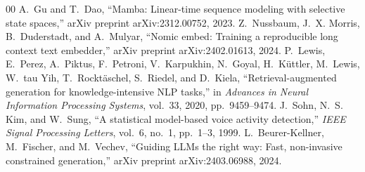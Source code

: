 \documentclass[conference]{IEEEtran}
\begin{document}
\begin{thebibliography}{00}
 A.~Gu and T.~Dao, ``Mamba: Linear-time sequence modeling with selective state spaces,'' arXiv preprint arXiv:2312.00752, 2023.
 Z.~Nussbaum, J.~X. Morris, B.~Duderstadt, and A.~Mulyar, ``Nomic embed: Training a reproducible long context text embedder,'' arXiv preprint arXiv:2402.01613, 2024.
 P.~Lewis, E.~Perez, A.~Piktus, F.~Petroni, V.~Karpukhin, N.~Goyal, H.~K\"uttler, M.~Lewis, W.~tau Yih, T.~Rockt\"aschel, S.~Riedel, and D.~Kiela, ``Retrieval-augmented generation for knowledge-intensive NLP tasks,'' in \textit{Advances in Neural Information Processing Systems}, vol.~33, 2020, pp.~9459--9474.
 J.~Sohn, N.~S. Kim, and W.~Sung, ``A statistical model-based voice activity detection,'' \textit{IEEE Signal Processing Letters}, vol.~6, no.~1, pp.~1--3, 1999.
 L.~Beurer-Kellner, M.~Fischer, and M.~Vechev, ``Guiding LLMs the right way: Fast, non-invasive constrained generation,'' arXiv preprint arXiv:2403.06988, 2024.
\end{thebibliography}
\end{document}
